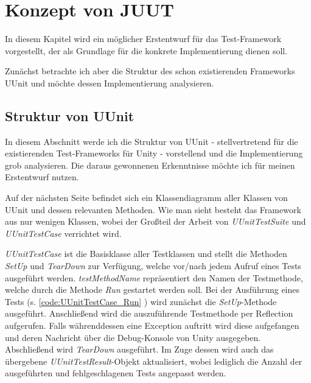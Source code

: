 \chapter{Konzept von JUUT}

In diesem Kapitel wird ein möglicher Erstentwurf für das Test-Framework vorgestellt, der als Grundlage für die konkrete Implementierung dienen soll.

Zunächst betrachte ich aber die Struktur des schon existierenden Frameworks UUnit und möchte dessen Implementierung analysieren.

\section{Struktur von UUnit}

In diesem Abschnitt werde ich die Struktur von UUnit - stellvertretend für die existierenden Test-Frameworks für Unity - vorstellend und die Implementierung grob analysieren. Die daraus gewonnenen Erkenntnisse möchte ich für meinen Erstentwurf nutzen.

Auf der nächsten Seite befindet sich ein Klassendiagramm aller Klassen von UUnit und dessen relevanten Methoden. Wie man sieht besteht das Framework aus nur wenigen Klassen, wobei der Großteil der Arbeit von \textit{UUnitTestSuite} und \textit{UUnitTestCase} verrichtet wird.

\textit{UUnitTestCase} ist die Basisklasse aller Testklassen und stellt die Methoden \textit{SetUp} und \textit{TearDown} zur Verfügung, welche vor/nach jedem Aufruf eines Tests ausgeführt werden. \textit{testMethodName} repräsentiert den Namen der Testmethode, welche durch die Methode \textit{Run} gestartet werden soll. Bei der Ausführung eines Tests (s. \autoref{code:UUnitTestCase_Run} ) wird zunächst die \textit{SetUp}-Methode ausgeführt. Anschließend wird die auszuführende Testmethode per Reflection aufgerufen. Falls währenddessen eine Exception auftritt wird diese aufgefangen und deren Nachricht über die Debug-Konsole von Unity ausgegeben. Abschließend wird \textit{TearDown} ausgeführt. Im Zuge dessen wird auch das übergebene \textit{UUnitTestResult}-Objekt aktualisiert, wobei lediglich die Anzahl der ausgeführten und fehlgeschlagenen Tests angepasst werden.

